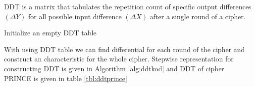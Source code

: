 \begin{definition}
  DDT is a matrix that tabulates the repetition count of specific output differences $(\Delta Y)$ for all possible input difference $(\Delta X)$ after a single round of a cipher.
\end{definition}
\vspace{1 em}
    \begin{algorithm}[H]
        \DontPrintSemicolon
        Initialize an empty DDT table \\
        \caption{Pseudocode for DDT }
        \label{alg:ddtkod}
    \end{algorithm}
\vspace{2 em}

With using DDT table we can find differential for each round of the cipher and construct an characteristic for the whole cipher. Stepwise representation for constructing DDT is given in Algorithm \ref{alg:ddtkod} and DDT of cipher PRINCE \cite{borghoff2012prince} is given in table \ref{tbl:ddtprince}

